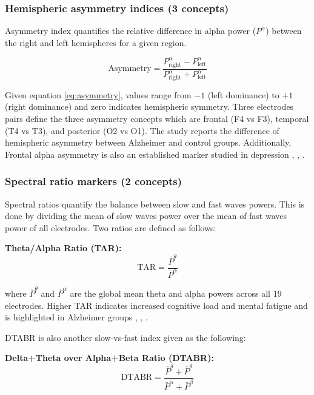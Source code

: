 \documentclass[journal,twoside,web]{ieeecolor}
\begin{document}
\subsubsection{Hemispheric asymmetry indices (3 concepts)}
\hfill \break
Asymmetry index quantifies the relative difference in alpha power ($P^{\alpha}$) between the right and left hemispheres for a given region.

\begin{equation}
  \text{Asymmetry} =
  \frac{P_\text{right}^{\alpha} - P_\text{left}^{\alpha}}
       {P_\text{right}^{\alpha} + P_\text{left}^{\alpha}}
  \label{eq:asymmetry}
\end{equation}

Given equation \ref{eq:asymmetry}, values range from $-1$ (left dominance) to $+1$ (right dominance) and zero indicates hemispheric symmetry. Three electrodes pairs define the three asymmetry concepts which are frontal (F4 vs F3), temporal (T4 vs T3), and posterior (O2 vs O1). The study \cite{mizrak2024investigation} reports the difference of hemispheric asymmetry between Alzheimer and control groups. Additionally, Frontal alpha asymmetry is also an established marker studied in depression \cite{davidson2004}, \cite{peng2026altered}, \cite{jia2026hemispheric}.


\subsubsection{Spectral ratio markers (2 concepts)}
\hfill \break
Spectral ratios quantify the balance between slow and fast waves powers. This is done by dividing the mean of slow waves power over the mean of fast waves power of all electrodes. Two ratios are defined as follows:

\textbf{Theta/Alpha Ratio (TAR):}
\begin{equation}
  \text{TAR} =
  \frac{\bar{P}^{\theta}}{\bar{P}^{\alpha}}
  \label{eq:tar}
\end{equation}

where $\bar{P}^{\theta}$ and $\bar{P}^{\alpha}$ are the global mean theta and alpha powers across all $19$ electrodes. Higher TAR indicates increased cognitive load and mental fatigue and is highlighted in Alzheimer groups \cite{wascher2014frontal}, \cite{borghini2014measuring}, \cite{olugun2024quantitative}.

DTABR is also another slow-vs-fast index given as the following:

\textbf{Delta+Theta over Alpha+Beta Ratio (DTABR):}
\begin{equation}
  \text{DTABR} =
  \frac{\bar{P}^{\delta} + \bar{P}^{\theta}}
       {\bar{P}^{\alpha} + \bar{P}^{\beta}}
  \label{eq:dtabr}
\end{equation}
\end{document}
